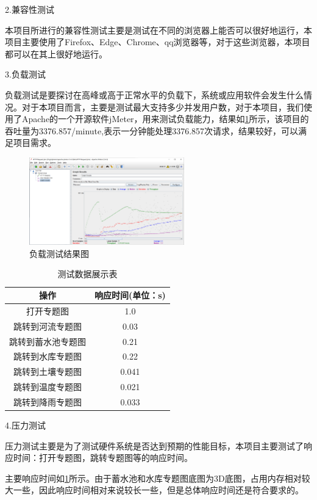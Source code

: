 2.兼容性测试

本项目所进行的兼容性测试主要是测试在不同的浏览器上能否可以很好地运行，本项目主要使用了Firefox、Edge、Chrome、qq浏览器等，对于这些浏览器，本项目都可以在其上很好地运行。

3.负载测试

负载测试是要探讨在高峰或高于正常水平的负载下，系统或应用软件会发生什么情况。对于本项目而言，主要是测试最大支持多少并发用户数，对于本项目，我们使用了Apache的一个开源软件jMeter，用来测试负载能力，结果如\ref{fig:fuzaiceshi}所示，该项目的吞吐量为3376.857/minute,表示一分钟能处理3376.857次请求，结果较好，可以满足项目需求。

\begin{figure}[!htb]%
	\centering
	\includegraphics[width=0.60\textwidth,height=0.2\textheight]{figs/fuzaiceshi.png}
	\caption{负载测试结果图}
	\label{fig:fuzaiceshi}
\end{figure}
\begin{table}[H]
	\centering
	\caption[测试数据]{测试数据展示表}
	\label{test}
	\begin{tabular}{cc}
		\toprule
		操作          & 响应时间(单位：s)    \\
		\midrule
		打开专题图        &1.0  \\
		跳转到河流专题图     &0.03 \\
		跳转到蓄水池专题图    &0.21    \\
		跳转到水库专题图     &0.22    \\
		跳转到土壤专题图     &0.041    \\
		跳转到温度专题图     &0.021    \\
		跳转到降雨专题图     &0.033    \\
		
		
		\bottomrule
	\end{tabular}
\end{table}


4.压力测试

压力测试主要是为了测试硬件系统是否达到预期的性能目标，本项目主要测试了响应时间：打开专题图，跳转专题图等的响应时间。

主要响应时间如\ref{test}所示。由于蓄水池和水库专题图底图为3D底图，占用内存相对较大一些，因此响应时间相对来说较长一些，但是总体响应时间还是符合要求的。




